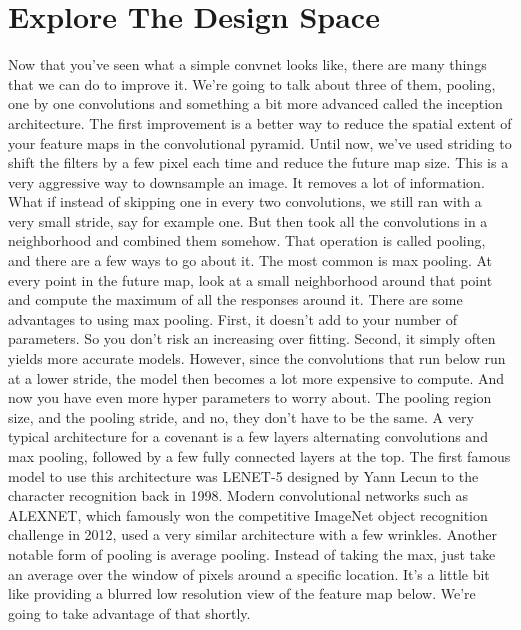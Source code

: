 \documentclass{article}
\begin{document}
\section{Explore The Design Space}
Now that you've seen what
a simple convnet looks like,
there are many things that
we can do to improve it.
We're going to talk about three of them,
pooling, one by one convolutions and
something a bit more advanced
called the inception architecture.
The first improvement is a better way
to reduce the spatial extent of your
feature maps in
the convolutional pyramid.
Until now, we've used striding to shift
the filters by a few pixel each time and
reduce the future map size.
This is a very aggressive
way to downsample an image.
It removes a lot of information.
What if instead of skipping
one in every two convolutions,
we still ran with a very small stride,
say for example one.
But then took all the convolutions in a
neighborhood and combined them somehow.
That operation is called pooling, and
there are a few ways to go about it.
The most common is max pooling.
At every point in the future map,
look at a small neighborhood around that
point and compute the maximum
of all the responses around it.
There are some advantages
to using max pooling.
First, it doesn't add to
your number of parameters.
So you don't risk
an increasing over fitting.
Second, it simply often
yields more accurate models.
However, since the convolutions that
run below run at a lower stride,
the model then becomes a lot
more expensive to compute.
And now you have even more hyper
parameters to worry about.
The pooling region size, and
the pooling stride, and no,
they don't have to be the same.
A very typical architecture for
a covenant is a few layers
alternating convolutions and
max pooling, followed by a few
fully connected layers at the top.
The first famous model to use this
architecture was LENET-5 designed by
Yann Lecun to the character
recognition back in 1998.
Modern convolutional networks
such as ALEXNET, which
famously won the competitive ImageNet
object recognition challenge in 2012,
used a very similar architecture
with a few wrinkles.
Another notable form of
pooling is average pooling.
Instead of taking the max,
just take an average over the window
of pixels around a specific location.
It's a little bit like providing
a blurred low resolution view of
the feature map below.
We're going to take
advantage of that shortly.
\end{document}
